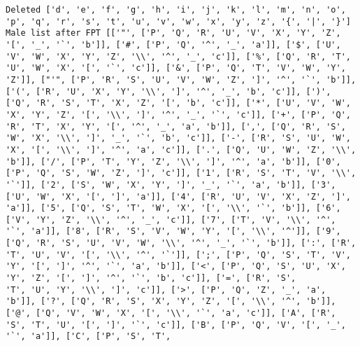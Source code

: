 \documentclass{article}
\begin{document}
\begin{verbatim}
Deleted ['d', 'e', 'f', 'g', 'h', 'i', 'j', 'k', 'l', 'm', 'n', 'o', 'p', 'q', 'r', 's', 't', 'u', 'v', 'w', 'x', 'y', 'z', '{', '|', '}']
Male list after FPT [['"', ['P', 'Q', 'R', 'U', 'V', 'X', 'Y', 'Z', '[', '_', '`', 'b']], ['#', ['P', 'Q', '^', '_', 'a']], ['$', ['U', 'V', 'W', 'X', 'Y', 'Z', '\\', '^', '_', 'c']], ['%', ['Q', 'R', 'T', 'U', 'W', 'X', '[', '`', 'c']], ['&', ['P', 'Q', 'T', 'V', 'W', 'Y', 'Z']], ["'", ['P', 'R', 'S', 'U', 'V', 'W', 'Z', ']', '^', '`', 'b']], ['(', ['R', 'U', 'X', 'Y', '\\', ']', '^', '_', 'b', 'c']], [')', ['Q', 'R', 'S', 'T', 'X', 'Z', '[', 'b', 'c']], ['*', ['U', 'V', 'W', 'X', 'Y', 'Z', '[', '\\', ']', '^', '_', '`', 'c']], ['+', ['P', 'Q', 'R', 'T', 'X', 'Y', '[', '^', '_', 'a', 'b']], [',', ['Q', 'R', 'S', 'W', 'X', '\\', ']', '_', '`', 'b', 'c']], ['-', ['R', 'S', 'U', 'W', 'X', '[', '\\', ']', '^', 'a', 'c']], ['.', ['Q', 'U', 'W', 'Z', '\\', 'b']], ['/', ['P', 'T', 'Y', 'Z', '\\', ']', '^', 'a', 'b']], ['0', ['P', 'Q', 'S', 'W', 'Z', ']', 'c']], ['1', ['R', 'S', 'T', 'V', '\\', '`']], ['2', ['S', 'W', 'X', 'Y', ']', '_', '`', 'a', 'b']], ['3', ['U', 'W', 'X', '[', ']', 'a']], ['4', ['R', 'U', 'V', 'X', 'Z', ']', 'a']], ['5', ['Q', 'S', 'T', 'W', 'X', '[', '\\', '`', 'b']], ['6', ['V', 'Y', 'Z', '\\', '^', '_', 'c']], ['7', ['T', 'V', '\\', '^', '`', 'a']], ['8', ['R', 'S', 'V', 'W', 'Y', '[', '\\', '^']], ['9', ['Q', 'R', 'S', 'U', 'V', 'W', '\\', '^', '_', '`', 'b']], [':', ['R', 'T', 'U', 'V', '[', '\\', '^', '`']], [';', ['P', 'Q', 'S', 'T', 'V', 'Y', '[', ']', '^', '`', 'a', 'b']], ['<', ['P', 'Q', 'S', 'U', 'X', 'Y', 'Z', '[', ']', '^', '`', 'b', 'c']], ['=', ['R', 'S', 
'T', 'U', 'Y', '\\', ']', 'c']], ['>', ['P', 'Q', 'Z', '_', 'a', 'b']], ['?', ['Q', 'R', 'S', 'X', 'Y', 'Z', '[', '\\', '^', 'b']], ['@', ['Q', 'V', 'W', 'X', '[', '\\', '`', 'a', 'c']], ['A', ['R', 'S', 'T', 'U', '[', ']', '`', 'c']], ['B', ['P', 'Q', 'V', '[', '_', '`', 'a']], ['C', ['P', 'S', 'T', 

\end{verbatim}
\end{document}
